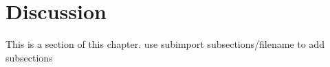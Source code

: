
\chapter{Discussion}
This is a section of this chapter.
use subimport {subsections/}{filename} to add subsections
